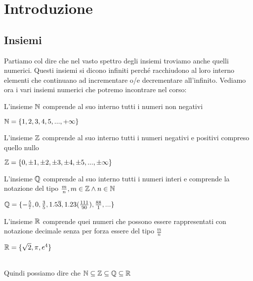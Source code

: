 \chapter{Introduzione}
\section{Insiemi}
Partiamo col dire che nel vasto spettro degli insiemi troviamo anche quelli numerici. Questi insiemi si dicono infiniti 
perché racchiudono al loro interno elementi che continuano ad incrementare o/e decrementare all'infinito. Vediamo ora i 
vari insiemi numerici che potremo incontrare nel corso:\\
\begin{definizione}\label{nnaturali}
  L'insieme $\mathbb{\MakeUppercase{n}}$ comprende al suo interno tutti i numeri non negativi\\
  \begin{es}
   $\mathbb{\MakeUppercase{n}}=\{1,2,3,4,5,...,+\infty\}$
  \end{es}
\end{definizione}

\begin{definizione}\label{ninteri}
  L'insieme $\mathbb{\MakeUppercase{z}}$ comprende al suo interno tutti i numeri negativi e positivi compreso quello nullo\\
  \begin{es}
   $\mathbb{\MakeUppercase{z}}=\{0,\pm1,\pm2,\pm3,\pm4,\pm5,...,\pm\infty\}$
  \end{es}
\end{definizione}

\begin{definizione}\label{nrazionali}
  L'insieme $\mathbb{\MakeUppercase{q}}$ comprende al suo interno tutti i numeri interi e comprende la notazione del tipo $\frac{m}{n}, m\in\mathbb{\MakeUppercase{z}} \wedge n\in\mathbb{\MakeUppercase{n}}$\\
  \begin{es}
   $\mathbb{\MakeUppercase{q}}=\{-\frac{5}{7},0,\frac{3}{5},1.5\overline{3},1.23(\frac{111}{90}),\frac{88}{1},...\}$
  \end{es}
\end{definizione}

\begin{definizione}\label{nreali}
  L'insieme $\mathbb{\MakeUppercase{r}}$ comprende quei numeri che possono essere rappresentati con notazione decimale senza per forza essere del tipo $\frac{m}{n}$ \\
  \begin{es}
   $\mathbb{\MakeUppercase{r}}=\{\sqrt{2},\pi,e^{4}\}$
  \end{es}
\end{definizione}
\leavevmode\\
Quindi possiamo dire che $\mathbb{\MakeUppercase{n}}\subseteq\mathbb{\MakeUppercase{z}}\subseteq\mathbb{\MakeUppercase{q}}\subseteq\mathbb{\MakeUppercase{r}}$
